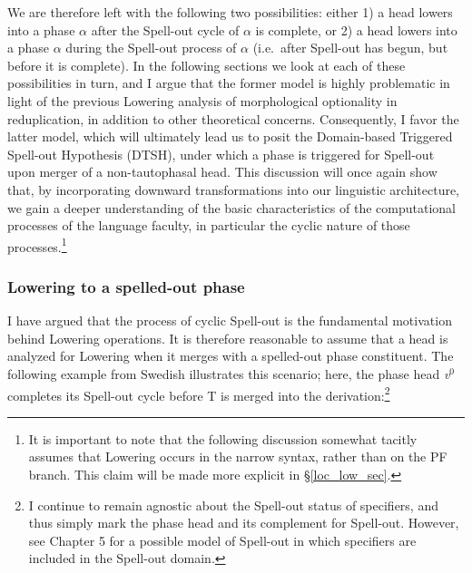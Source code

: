 We are therefore left with the following two possibilities: either 1) a head lowers into a phase $\alpha$ after the Spell-out cycle of $\alpha$ is complete, or 2) a head lowers into a phase $\alpha$ during the Spell-out process of $\alpha$ (i.e.\ after Spell-out has begun, but before it is complete). In the following sections we look at each of these possibilities in turn, and I argue that the former model is highly problematic in light of the previous Lowering analysis of morphological optionality in reduplication, in addition to other theoretical concerns. Consequently, I favor the latter model, which will ultimately lead us to posit the Domain-based Triggered Spell-out Hypothesis (DTSH), under which a phase is triggered for Spell-out upon merger of a non-tautophasal head. This discussion will once again show that, by incorporating downward transformations into our linguistic architecture, we gain a deeper understanding of the basic characteristics of the computational processes of the language faculty, in particular the cyclic nature of those processes.\footnote{It is important to note that the following discussion somewhat tacitly assumes that Lowering occurs in the narrow syntax, rather than on the PF branch. This claim will be made more explicit in \S\ref{loc_low_sec}.}

\subsubsection{Lowering to a spelled-out phase}
I have argued that the process of cyclic Spell-out is the fundamental motivation behind Lowering operations. It is therefore reasonable to assume that a head is analyzed for Lowering when it merges with a spelled-out phase constituent. The following example from Swedish illustrates this scenario; here, the phase head {\it v}$^{0}$ completes its Spell-out cycle before T\raisebox{-4pt}{\footnotesize{[-V]}} is merged into the derivation:\footnote{I continue to remain agnostic about the Spell-out status of specifiers, and thus simply mark the phase head and its complement for Spell-out. However, see Chapter 5 for a possible model of Spell-out in which specifiers are included in the Spell-out domain.}

